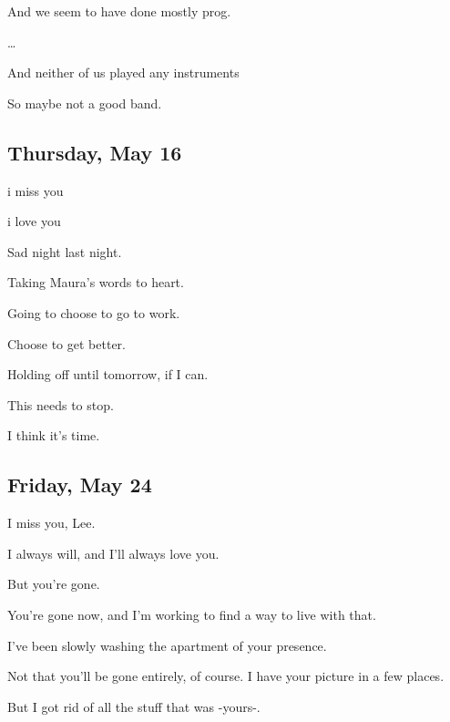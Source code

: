 {
And we seem to have done mostly
prog.

\ldots{}

And neither of us played any
instruments

So maybe not a good band.

\newpage

\subsection*{Thursday, May 16}\label{thursday-may-16}

i miss you

i love you

Sad night last night.

Taking Maura's words to heart.

Going to choose to go to work.

Choose to get better.

Holding off until tomorrow, if I
can.

This needs to stop.

I think it's time.

\newpage

\subsection*{Friday, May 24}\label{friday-may-24}

I miss you, Lee.

I always will, and I'll always love
you.

But you're gone.

You're gone now, and I'm working to
find a way to live with that.

I've been slowly washing the
apartment of your presence.

Not that you'll be gone entirely, of
course. I have your picture in a few places.

But I got rid of all the stuff that was
-yours-.

}

